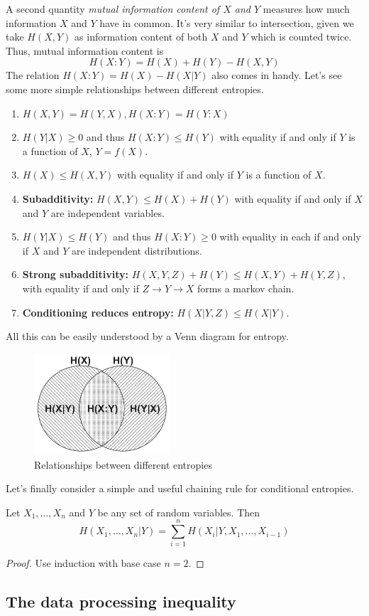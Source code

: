 A second quantity \textit{mutual information content of $X$ and $Y$} measures how much information $X$ and $Y$ have in common. It's very similar to intersection, given we take $H(X,Y)$ as information content of both $X$ and $Y$ which is counted twice. Thus, mutual information content is
\begin{equation}
    H(X:Y) = H(X) + H(Y) - H(X, Y)
\end{equation}
The relation $H(X:Y) = H(X) - H(X|Y)$ also comes in handy. Let's see some more simple relationships between different entropies.

\begin{ntheorem}
    \begin{enumerate}
        \item $H(X, Y) = H(Y, X), H(X:Y) = H(Y:X)$
        \item $H(Y|X) \geq 0$ and thus $H(X:Y)\leq H(Y)$ with equality if and only if $Y$ is a function of $X$, $Y=f(X)$.
        \item $H(X) \leq H(X,Y)$ with equality if and only if $Y$ is a function of $X$.
        \item \textbf{Subadditivity:} $H(X, Y) \leq H(X) + H(Y)$ with equality if and only if $X$ and $Y$ are independent variables.
        \item $H(Y|X) \leq H(Y)$ and thus $H(X:Y) \geq 0$ with equality in each if and only if $X$ and $Y$ are independent distributions.
        \item \textbf{Strong subadditivity:} $H(X,Y,Z) + H(Y) \leq H(X,Y) + H(Y, Z)$, with equality if and only if $Z\rightarrow Y\rightarrow X$ forms a markov chain.
        \item \textbf{Conditioning reduces entropy:} $H(X|Y,Z) \leq H(X|Y)$.
    \end{enumerate}
\end{ntheorem}
All this can be easily understood by a Venn diagram for entropy.
\begin{figure}[H]
    \centering
    \includegraphics[width=0.45\textwidth]{images/venn_entropy.png}
    \caption{Relationships between different entropies}
    \label{fig:venn-entropy}
\end{figure}
Let's finally consider a simple and useful chaining rule for conditional entropies.
\begin{theorem}
    Let $X_1,\dots,X_n$ and $Y$ be any set of random variables. Then
    \begin{equation}
        H(X_1,\dots,X_n|Y) = \sum_{i=1}^n H(X_i|Y,X_1,\dots,X_{i-1})
    \end{equation}
\end{theorem}
\begin{proof}
    Use induction with base case $n=2$.
\end{proof}

\subsection{The data processing inequality}

